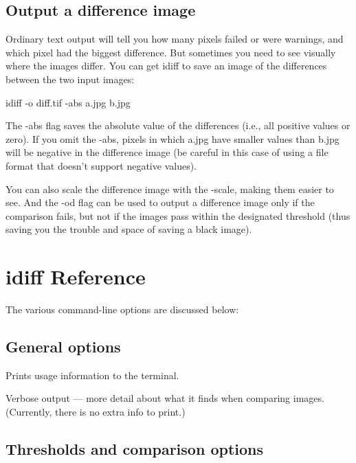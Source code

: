 

\subsection*{Output a difference image}

Ordinary text output will tell you how many pixels failed or were
warnings, and which pixel had the biggest difference.  But sometimes
you need to see visually where the images differ.  You can get
{\cf idiff} to save an image of the differences between the two input
images:

\begin{code}
    idiff -o diff.tif -abs a.jpg b.jpg
\end{code}

The {\cf -abs} flag saves the absolute value of the differences
(i.e., all positive values or zero).  If you omit the {\cf -abs},
pixels in which {\cf a.jpg} have smaller values than {\cf b.jpg}
will be negative in the difference image (be careful in this case
of using a file format that doesn't support negative values).

You can also scale the difference image with the {\cf -scale},
making them easier to see.  And the {\cf -od} flag can be used
to output a difference image only if the comparison fails, but 
not if the images pass within the designated threshold (thus
saving you the trouble and space of saving a black image).


\section{{\cf idiff} Reference}

The various command-line options are discussed below:

\subsection*{General options}

Prints usage information to the terminal.
\apiend

Verbose output --- more detail about what it finds when comparing
images.  (Currently, there is no extra info to print.)
\apiend


\subsection*{Thresholds and comparison options}

